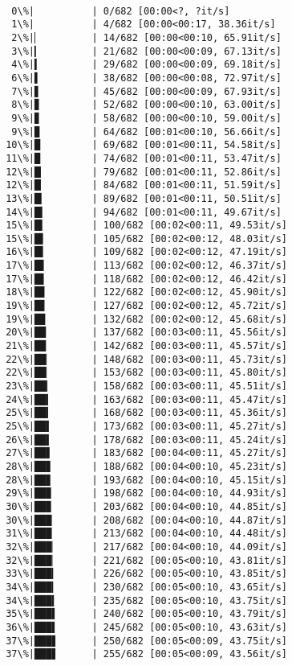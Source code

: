 \documentclass[11pt]{article}
\begin{document}
    \begin{Verbatim}[commandchars=\\\{\}]

  0\%|          | 0/682 [00:00<?, ?it/s]
  1\%|          | 4/682 [00:00<00:17, 38.36it/s]
  2\%|▏         | 14/682 [00:00<00:10, 65.91it/s]
  3\%|▎         | 21/682 [00:00<00:09, 67.13it/s]
  4\%|▍         | 29/682 [00:00<00:09, 69.18it/s]
  6\%|▌         | 38/682 [00:00<00:08, 72.97it/s]
  7\%|▋         | 45/682 [00:00<00:09, 67.93it/s]
  8\%|▊         | 52/682 [00:00<00:10, 63.00it/s]
  9\%|▊         | 58/682 [00:00<00:10, 59.00it/s]
  9\%|▉         | 64/682 [00:01<00:10, 56.66it/s]
 10\%|█         | 69/682 [00:01<00:11, 54.58it/s]
 11\%|█         | 74/682 [00:01<00:11, 53.47it/s]
 12\%|█▏        | 79/682 [00:01<00:11, 52.86it/s]
 12\%|█▏        | 84/682 [00:01<00:11, 51.59it/s]
 13\%|█▎        | 89/682 [00:01<00:11, 50.51it/s]
 14\%|█▍        | 94/682 [00:01<00:11, 49.67it/s]
 15\%|█▍        | 100/682 [00:02<00:11, 49.53it/s]
 15\%|█▌        | 105/682 [00:02<00:12, 48.03it/s]
 16\%|█▌        | 109/682 [00:02<00:12, 47.19it/s]
 17\%|█▋        | 113/682 [00:02<00:12, 46.37it/s]
 17\%|█▋        | 118/682 [00:02<00:12, 46.42it/s]
 18\%|█▊        | 122/682 [00:02<00:12, 45.90it/s]
 19\%|█▊        | 127/682 [00:02<00:12, 45.72it/s]
 19\%|█▉        | 132/682 [00:02<00:12, 45.68it/s]
 20\%|██        | 137/682 [00:03<00:11, 45.56it/s]
 21\%|██        | 142/682 [00:03<00:11, 45.57it/s]
 22\%|██▏       | 148/682 [00:03<00:11, 45.73it/s]
 22\%|██▏       | 153/682 [00:03<00:11, 45.80it/s]
 23\%|██▎       | 158/682 [00:03<00:11, 45.51it/s]
 24\%|██▍       | 163/682 [00:03<00:11, 45.47it/s]
 25\%|██▍       | 168/682 [00:03<00:11, 45.36it/s]
 25\%|██▌       | 173/682 [00:03<00:11, 45.27it/s]
 26\%|██▌       | 178/682 [00:03<00:11, 45.24it/s]
 27\%|██▋       | 183/682 [00:04<00:11, 45.27it/s]
 28\%|██▊       | 188/682 [00:04<00:10, 45.23it/s]
 28\%|██▊       | 193/682 [00:04<00:10, 45.15it/s]
 29\%|██▉       | 198/682 [00:04<00:10, 44.93it/s]
 30\%|██▉       | 203/682 [00:04<00:10, 44.85it/s]
 30\%|███       | 208/682 [00:04<00:10, 44.87it/s]
 31\%|███       | 213/682 [00:04<00:10, 44.48it/s]
 32\%|███▏      | 217/682 [00:04<00:10, 44.09it/s]
 32\%|███▏      | 221/682 [00:05<00:10, 43.81it/s]
 33\%|███▎      | 226/682 [00:05<00:10, 43.85it/s]
 34\%|███▎      | 230/682 [00:05<00:10, 43.65it/s]
 34\%|███▍      | 235/682 [00:05<00:10, 43.75it/s]
 35\%|███▌      | 240/682 [00:05<00:10, 43.79it/s]
 36\%|███▌      | 245/682 [00:05<00:10, 43.63it/s]
 37\%|███▋      | 250/682 [00:05<00:09, 43.75it/s]
 37\%|███▋      | 255/682 [00:05<00:09, 43.56it/s]

\end{Verbatim}
\end{document}
